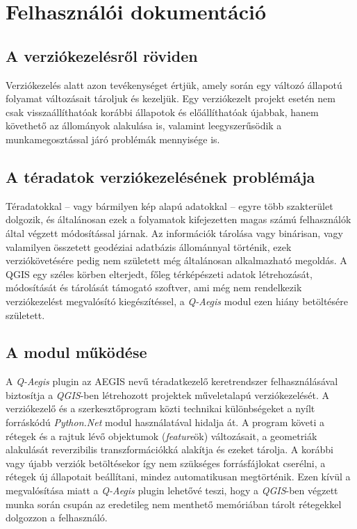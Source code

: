 \chapter{Felhasználói dokumentáció}
\label{ch:user}
\section{A verziókezelésről röviden}
Verziókezelés alatt azon tevékenységet értjük, amely során egy változó állapotú folyamat változásait tároljuk és kezeljük. Egy verziókezelt projekt esetén nem csak visszaállíthatóak korábbi állapotok és előállíthatóak újabbak, hanem követhető az állományok alakulása is, valamint leegyszerűsödik a munkamegosztással járó problémák mennyisége is.   
\section{A téradatok verziókezelésének problémája}
Téradatokkal -- vagy bármilyen kép alapú adatokkal -- egyre több szakterület dolgozik, és általánosan ezek a folyamatok kifejezetten magas számú felhasználók által végzett módosítással járnak. Az információk tárolása vagy binárisan, vagy valamilyen összetett geodéziai adatbázis állománnyal történik, ezek verziókövetésére pedig nem született még általánosan alkalmazható megoldás. A QGIS egy széles körben elterjedt, főleg térképészeti adatok létrehozását, módosítását és tárolását támogató szoftver, ami még nem rendelkezik verziókezelést megvalósító kiegészítéssel, a \emph{Q-Aegis} modul ezen hiány betöltésére született.
\section{A modul működése}
A \emph{Q-Aegis} plugin az AEGIS nevű téradatkezelő keretrendszer felhasználásával biztosítja a \emph{QGIS}-ben létrehozott projektek műveletalapú verziókezelését. A verziókezelő és a szerkesztőprogram közti technikai különbségeket a nyílt forráskódú \emph{Python.Net} \cite{pythonnet} modul használatával hidalja át. A program követi a rétegek és a rajtuk lévő objektumok (\emph{feature}ök) változásait, a geometriák alakulását reverzibilis transzformációkká alakítja és ezeket tárolja. A korábbi vagy újabb verziók betöltésekor így nem szükséges forrásfájlokat cserélni, a rétegek új állapotait beállítani, mindez automatikusan megtörténik. Ezen kívül a megvalósítása miatt a \emph{Q-Aegis} plugin lehetővé teszi, hogy a \emph{QGIS}-ben végzett munka során csupán az eredetileg nem menthető memóriában tárolt rétegekkel dolgozzon a felhasználó.

